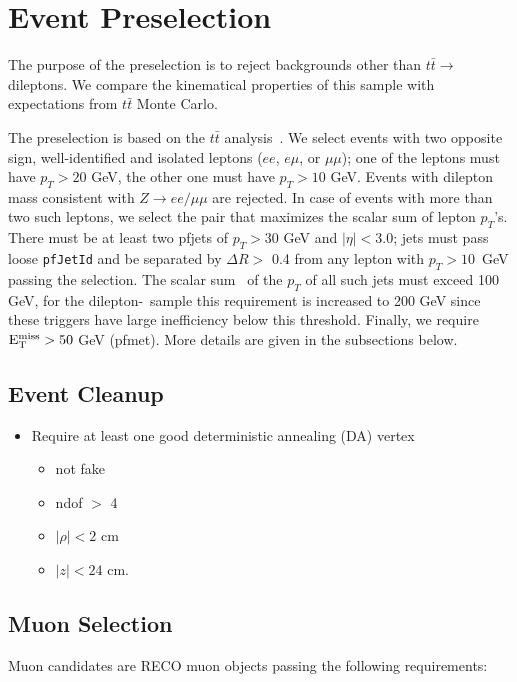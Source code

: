 \section{Event Preselection}
\label{sec:eventSel}
The purpose of the preselection is to reject backgrounds other than 
$t\bar{t} \to$ dileptons.  We compare the kinematical 
properties of this sample with expectations from $t\bar{t}$ 
Monte Carlo.

The preselection is based on the 
$t\bar{t}$ analysis~\cite{ref:top}.  
We select events with two opposite sign, well-identified and isolated
leptons ($ee$, $e\mu$, or $\mu\mu$); one of the leptons must 
have $p_T > 20$ GeV,
the other one must have $p_T > 10$ GeV. Events with dilepton mass
consistent with $Z \to ee/\mu\mu$ are rejected.
In case of events with 
more than two such leptons, we select the pair that maximizes the scalar 
sum of lepton $p_T$'s.
There must be at least two 
pfjets of $p_T > 30$ GeV and $|\eta| < 3.0$;  jets must pass
loose {\tt pfJetId} and be separated by $\Delta R >$ 0.4 from any 
lepton with $p_T > 10$~GeV passing the selection.
The scalar sum \Ht\ of the 
$p_T$ of all such jets must exceed 100 GeV, for the dilepton-\Ht\ sample
this requirement is increased to 200 GeV since these triggers have large inefficiency
below this threshold.
Finally, we require $\rm E_{T}^{miss} > 50$ GeV (pfmet). More details are given in the subsections below.

\subsection{Event Cleanup}
\label{sec:cleanup}

\begin{itemize}
   \item Require at least one good deterministic annealing (DA) vertex
   \begin{itemize}
      \item not fake
      \item ndof $>$ 4
      \item $|\rho| < 2$ cm
      \item $|z| < 24$ cm.  
   \end{itemize}
\end{itemize}


\subsection{Muon Selection}
\label{sec:muon}

Muon candidates are RECO muon objects passing the following
requirements:

